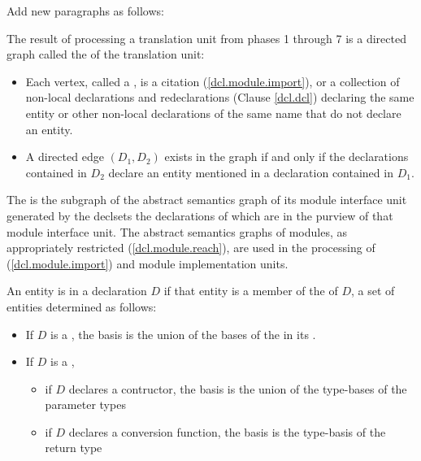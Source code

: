 Add new paragraphs as follows:
\begin{std.txt}\color{addclr}
    \resetalinea[1]
    \alinea
    The result of processing a translation unit from phases 1 through 7
    is a directed graph called the  of
    the translation unit:
    \begin{itemize}
        \item Each vertex, called a , is
            a citation (\ref{dcl.module.import}), or a collection of 
            non-local declarations and redeclarations (Clause \ref{dcl.dcl})
            declaring the same entity or other non-local declarations
            of the same name that do not declare an entity.
        \item A directed edge $(D_1, D_2)$ exists in the graph if and only if the 
        declarations contained in $D_2$ declare an entity mentioned 
        in a declaration contained in $D_1$.
    \end{itemize}
    The  is the subgraph of
    the abstract semantics graph of its module interface unit generated
    by the declsets the declarations of which are
     in the purview of that module interface unit.
    \enternote
    The abstract semantics graphs of modules,
    as appropriately restricted (\ref{dcl.module.reach}), are used in
    the processing of 
    (\ref{dcl.module.import}) and module implementation units.
    \exitnote

  \alinea
  An entity is  in a declaration $D$ if that entity is a member of the
   of $D$, a set of entities determined as follows:
  \begin{itemize}
    \item If $D$ is a , the basis is the union
    of the bases of the  in its
    .

    \item If $D$ is a ,
    \begin{itemize}
        \item if $D$ declares a contructor, the basis is
        the union of the type-bases of the parameter types

        \item if $D$ declares a conversion function, the basis is
        the type-basis of the return type


\end{itemize}
\end{itemize}
\end{std.txt}
